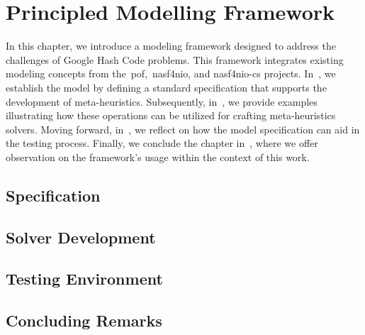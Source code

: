 \chapter{Principled Modelling Framework}
\label{ch:principled-modelling-framework}


In this chapter, we introduce a modeling framework designed to address the
challenges of Google Hash Code problems. This framework integrates existing
modeling concepts from the~\acrshort{pof},~\acrshort{nasf4nio}, and
\acrshort{nasf4nio-cs} projects. In~, we establish
the model by defining a standard specification that supports the development of
meta-heuristics. Subsequently, in~, we provide
examples illustrating how these operations can be utilized for crafting
meta-heuristics solvers. Moving forward, in~, we reflect on
how the model specification can aid in the testing process. Finally, we
conclude the chapter in~, where we offer
observation on the framework's usage within the context of this work.

\section{Specification}
\label{sec:model-definition}


\section{Solver Development}
\label{sec:meta-heuristic-dev}

\section{Testing Environment}
\label{sec:test-env}

\section{Concluding Remarks}
\label{sec:pmf-concluding-remarks}